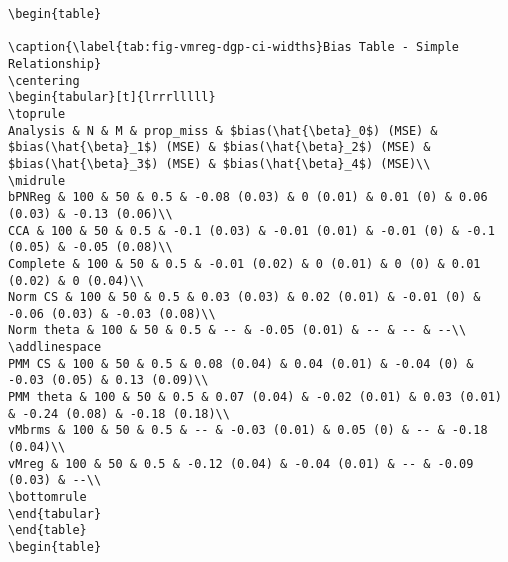 \documentclass[
]{article}
\begin{document}
\begin{verbatim}
\begin{table}

\caption{\label{tab:fig-vmreg-dgp-ci-widths}Bias Table - Simple Relationship}
\centering
\begin{tabular}[t]{lrrrlllll}
\toprule
Analysis & N & M & prop_miss & $bias(\hat{\beta}_0$) (MSE) & $bias(\hat{\beta}_1$) (MSE) & $bias(\hat{\beta}_2$) (MSE) & $bias(\hat{\beta}_3$) (MSE) & $bias(\hat{\beta}_4$) (MSE)\\
\midrule
bPNReg & 100 & 50 & 0.5 & -0.08 (0.03) & 0 (0.01) & 0.01 (0) & 0.06 (0.03) & -0.13 (0.06)\\
CCA & 100 & 50 & 0.5 & -0.1 (0.03) & -0.01 (0.01) & -0.01 (0) & -0.1 (0.05) & -0.05 (0.08)\\
Complete & 100 & 50 & 0.5 & -0.01 (0.02) & 0 (0.01) & 0 (0) & 0.01 (0.02) & 0 (0.04)\\
Norm CS & 100 & 50 & 0.5 & 0.03 (0.03) & 0.02 (0.01) & -0.01 (0) & -0.06 (0.03) & -0.03 (0.08)\\
Norm theta & 100 & 50 & 0.5 & -- & -0.05 (0.01) & -- & -- & --\\
\addlinespace
PMM CS & 100 & 50 & 0.5 & 0.08 (0.04) & 0.04 (0.01) & -0.04 (0) & -0.03 (0.05) & 0.13 (0.09)\\
PMM theta & 100 & 50 & 0.5 & 0.07 (0.04) & -0.02 (0.01) & 0.03 (0.01) & -0.24 (0.08) & -0.18 (0.18)\\
vMbrms & 100 & 50 & 0.5 & -- & -0.03 (0.01) & 0.05 (0) & -- & -0.18 (0.04)\\
vMreg & 100 & 50 & 0.5 & -0.12 (0.04) & -0.04 (0.01) & -- & -0.09 (0.03) & --\\
\bottomrule
\end{tabular}
\end{table}
\begin{table}


\end{verbatim}
\end{document}

